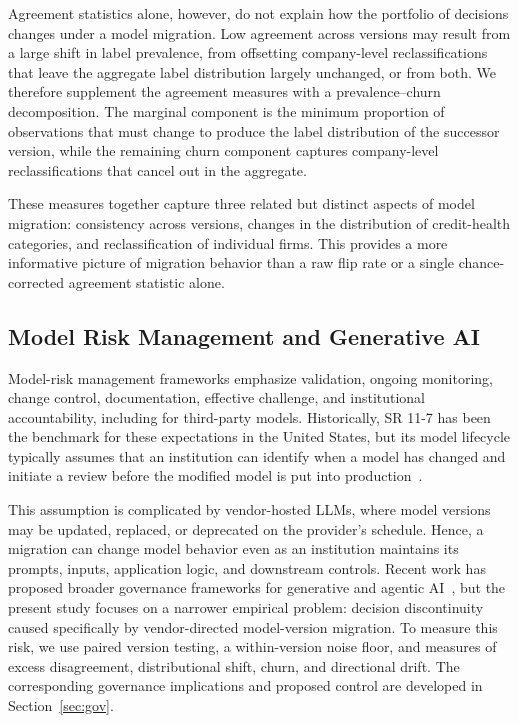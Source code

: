 \documentclass[11pt]{article}
\begin{document}
Agreement statistics alone, however, do not explain how the portfolio of decisions changes under a model migration. Low agreement across versions may result from a large shift in label prevalence, from offsetting company-level reclassifications that leave the aggregate label distribution largely unchanged, or from both. We therefore supplement the agreement measures with a prevalence--churn decomposition. The marginal component is the minimum proportion of observations that must change to produce the label distribution of the successor version, while the remaining churn component captures company-level reclassifications that cancel out in the aggregate.

These measures together capture three related but distinct aspects of model migration: consistency across versions, changes in the distribution of credit-health categories, and reclassification of individual firms. This provides a more informative picture of migration behavior than a raw flip rate or a single chance-corrected agreement statistic alone.

\subsection{Model Risk Management and Generative AI}
Model-risk management frameworks emphasize validation, ongoing monitoring, change control, documentation, effective challenge, and institutional accountability, including for third-party models. Historically, SR 11-7 has been the benchmark for these expectations in the United States, but its model lifecycle typically assumes that an institution can identify when a model has changed and initiate a review before the modified model is put into production~\cite{sr117}.

This assumption is complicated by vendor-hosted LLMs, where model versions may be updated, replaced, or deprecated on the provider's schedule. Hence, a migration can change model behavior even as an institution maintains its prompts, inputs, application logic, and downstream controls. Recent work has proposed broader governance frameworks for generative and agentic AI~\cite{mrm}, but the present study focuses on a narrower empirical problem: decision discontinuity caused specifically by vendor-directed model-version migration. To measure this risk, we use paired version testing, a within-version noise floor, and measures of excess disagreement, distributional shift, churn, and directional drift. The corresponding governance implications and proposed control are developed in Section~\ref{sec:gov}.
\end{document}
